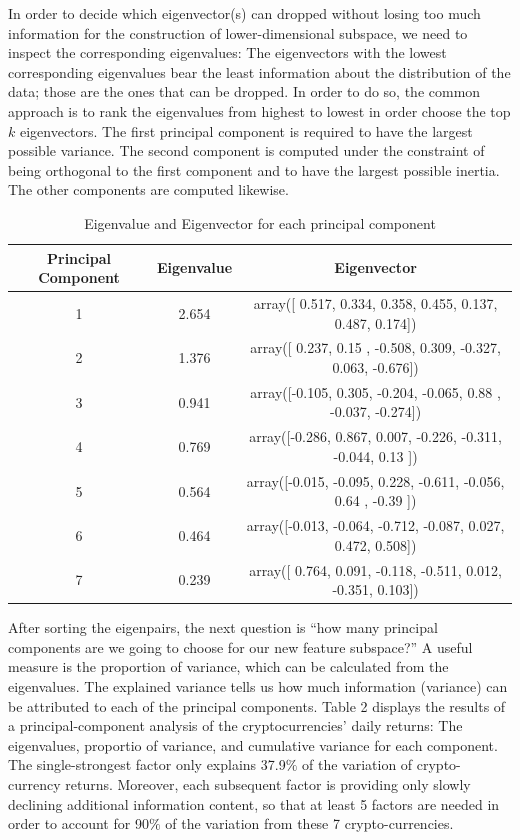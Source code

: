 \documentclass[12pt,twoside]{article}
\newcommand{\head}[1]{\textnormal{\textbf{#1}}}
\begin{document}
In order to decide which eigenvector(s) can dropped without losing too much information for the construction of lower-dimensional subspace, we need to inspect the corresponding eigenvalues: The eigenvectors with the lowest corresponding eigenvalues bear the least information about the distribution of the data; those are the ones that can be dropped. In order to do so, the common approach is to rank the eigenvalues from highest to lowest in order choose the top $k$ eigenvectors. The first principal component is required to have the largest possible variance. The second component is computed under the constraint of being orthogonal to the first component and to have the largest possible inertia. The other components are computed likewise.
\bigbreak
\begin{table}[H]
\begin{tabular}{ccc}
\hline
\head{Principal Component} & \head{Eigenvalue} & \head{Eigenvector}\\
\hline
1  & 2.654 & array([ 0.517,  0.334,  0.358,  0.455,  0.137,  0.487,  0.174])\\
2 & 1.376 &  array([ 0.237,  0.15 , -0.508,  0.309, -0.327,  0.063, -0.676])\\
3 & 0.941 & array([-0.105,  0.305, -0.204, -0.065,  0.88 , -0.037, -0.274])\\
4 & 0.769 & array([-0.286,  0.867,  0.007, -0.226, -0.311, -0.044,  0.13 ])\\
5 & 0.564 & array([-0.015, -0.095,  0.228, -0.611, -0.056,  0.64 , -0.39 ])\\
6 & 0.464 & array([-0.013, -0.064, -0.712, -0.087,  0.027,  0.472,  0.508])\\
7 & 0.239 & array([ 0.764,  0.091, -0.118, -0.511,  0.012, -0.351,  0.103])\\
\hline
\end{tabular}
\caption{Eigenvalue and Eigenvector for each principal component}
\end{table}
\bigbreak
After sorting the eigenpairs, the next question is “how many principal components are we going to choose for our new feature subspace?” A useful measure is the proportion of variance, which can be calculated from the eigenvalues. The explained variance tells us how much information (variance) can be attributed to each of the principal components.
\bigbreak
Table 2 displays the results of a principal-component analysis of the cryptocurrencies’ daily returns: The eigenvalues, proportio of variance, and cumulative variance for each component. The single-strongest factor only explains 37.9$\%$ of the variation of crypto-currency returns. Moreover, each subsequent factor is providing only slowly declining additional information content, so that at least 5 factors are needed in order to account for 90$\%$ of the variation from these 7 crypto-currencies. 
\end{document}
